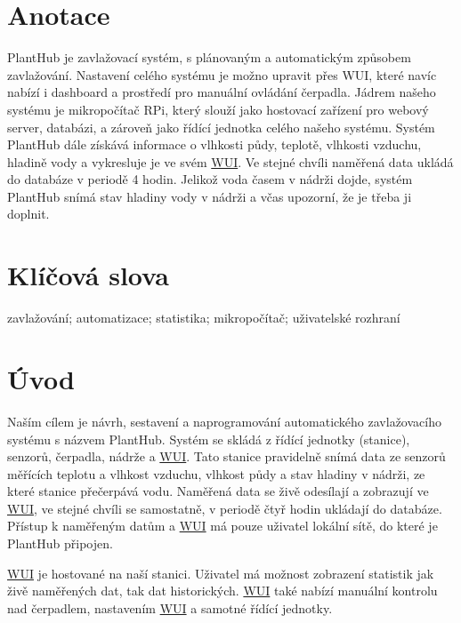 \documentclass[czech,12pt,a4paper]{article}
\begin{document}
\clearpage

\section*{Anotace}

PlantHub je zavlažovací systém, s plánovaným a automatickým způsobem zavlažování. Nastavení celého systému je možno upravit přes \ac{WUI}, které navíc nabízí i dashboard a prostředí pro manuální ovládání čerpadla. Jádrem našeho systému je mikropočítač \ac{RPi}, který slouží jako hostovací zařízení pro webový server, databázi, a zároveň jako řídící jednotka celého našeho systému. Systém PlantHub dále získává informace o vlhkosti půdy, teplotě, vlhkosti vzduchu, hladině vody a vykresluje je ve svém \underline{\ac{WUI}}. Ve stejné chvíli naměřená data ukládá do databáze v periodě 4 hodin. Jelikož voda časem v nádrži dojde, systém PlantHub snímá stav hladiny vody v nádrži a včas upozorní, že je třeba ji doplnit.

\section*{Klíčová slova}

\noindent zavlažování; automatizace; statistika; mikropočítač; uživatelské rozhraní

\clearpage

\tableofcontents

\clearpage

\section{Úvod}

Naším cílem je návrh, sestavení a naprogramování automatického zavlažovacího systému s názvem PlantHub. Systém se skládá z řídící jednotky (stanice), senzorů, čerpadla, nádrže a \space \underline{\ac{WUI}}. Tato stanice pravidelně snímá data ze senzorů měřících teplotu a vlhkost vzduchu, vlhkost půdy a stav hladiny v nádrži, ze které stanice přečerpává vodu. Naměřená data se živě odesílají a zobrazují ve \underline{\ac{WUI}}, ve stejné chvíli se samostatně, v periodě čtyř hodin ukládají do databáze. Přístup k naměřeným datům a \underline{\ac{WUI}} má pouze uživatel lokální sítě, do které je PlantHub připojen.

\underline{\ac{WUI}} je hostované na naší stanici. Uživatel má možnost zobrazení statistik jak živě naměřených dat, tak dat historických. \underline{\ac{WUI}} také nabízí manuální kontrolu nad čerpadlem, nastavením \underline{\ac{WUI}} a samotné řídící jednotky.
\end{document}
